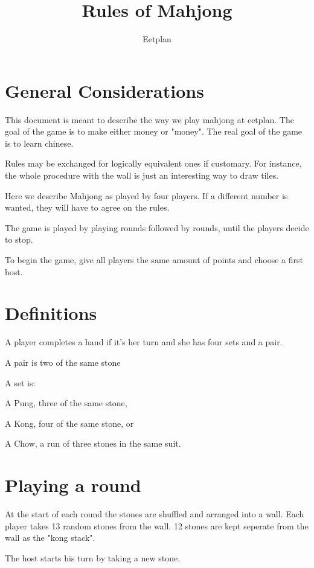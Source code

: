 \documentclass{article}
\begin{document}
\title{Rules of Mahjong}
\author{Eetplan}
\maketitle

\section{General Considerations}
This document is meant to describe the way we play mahjong at eetplan. The goal of the game is to make either money or "money". The real goal of the game is to learn chinese.

Rules may be exchanged for logically equivalent ones if customary. For instance, the whole procedure with the wall is just an interesting way to draw tiles.

Here we describe Mahjong as played by four players. If a different number is wanted, they will have to agree on the rules.

The game is played by playing rounds followed by rounds, until the players decide to stop.

To begin the game, give all players the same amount of points and choose a first host.

\section{Definitions}
A player completes a hand if it's her turn and she has four sets and a pair.

A pair is two of the same stone

A set is:
\begin{enumerate*}
    \item A Pung, three of the same stone,
    \item A Kong, four of the same stone, or
    \item A Chow, a run of three stones in the same suit.
\end{enumerate*}

\section{Playing a round}
At the start of each round the stones are shuffled and arranged into a wall. Each player takes 13 random stones from the wall. 12 stones are kept seperate from the wall as the "kong stack".

The host starts his turn by taking a new stone.
\end{document}
